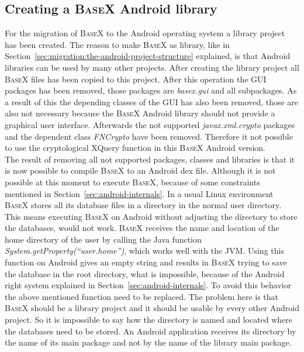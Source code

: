 \subsection{Creating a \textsc{BaseX} Android library}
\label{sec:migration:creating-a-basex-android-library}
For the migration of \textsc{BaseX} to the Android operating system a library project has been created.
The reason to make \textsc{BaseX} as library, like in Section~\ref{sec:migration:the-android-project-structure} explained, is that Android libraries can be used by many other projects.
After creating the library project all \textsc{BaseX} files has been copied to this project.
After this operation the GUI packages has been removed, those packages are \textit{basex.gui} and all subpackages.
As a result of this the depending classes of the GUI has also been removed, those are also not necessary because the \textsc{BaseX} Android library should not provide a graphical user interface.
Afterwards the not supported \textit{javax.xml.crypto} packages and the dependent class \textit{FNCrypto} have been removed.
Therefore it not possible to use the cryptological XQuery function in this \textsc{BaseX} Android version.\\
The result of removing all not supported packages, classes and libraries is that it is now possible to compile \textsc{BaseX} to an Android dex file.
Although it is not possible at this moment to execute \textsc{BaseX}, because of some constraints mentioned in Section~\ref{sec:android-internals}.
In a usual Linux environment \textsc{BaseX} stores all its database files in a directory in the normal user directory.
This means executing \textsc{BaseX} on Android without adjusting the directory to store the databases, would not work.
\textsc{BaseX} receives the name and location of the home directory of the user by calling the Java function \textit{System.getProperty(``user.home'')}, which works well with the JVM.
Using this function on Android gives an empty string and results in \textsc{BaseX} trying to save the database in the root directory, what is impossible, because of the Android right system explained in Section~\ref{sec:android-internals}.
To avoid this behavior the above mentioned function need to be replaced.
The problem here is that \textsc{BaseX} should be a library project and it should be usable by every other Android project.
So it is impossible to say how the directory is named and located where the databases need to be stored.
An Android application receives its directory by the name of its main package and not by the name of the library main package.
